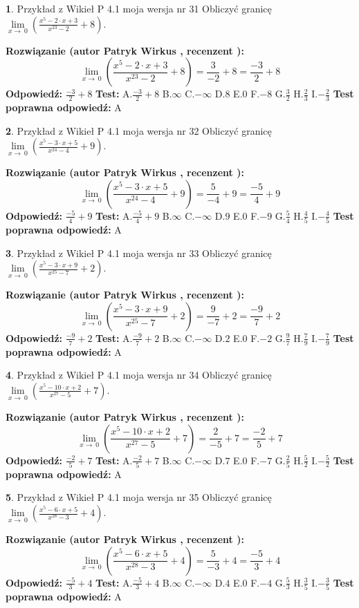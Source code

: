 \documentclass[12pt, a4paper]{article}
\theoremstyle{definition} %
\newtheorem{zad}{}
\newcommand{\zadStart}[1]{\begin{zad}#1\newline}
\newcommand{\zadStop}{\end{zad}}
\newcommand{\rozwStart}[2]{\noindent \textbf{Rozwiązanie (autor #1 , recenzent #2): }\newline}
\newcommand{\rozwStop}{\newline}
\newcommand{\odpStart}{\noindent \textbf{Odpowiedź:}\newline}
\newcommand{\odpStop}{\newline}
\newcommand{\testStart}{\noindent \textbf{Test:}\newline}
\newcommand{\testStop}{\newline}
\newcommand{\kluczStart}{\noindent \textbf{Test poprawna odpowiedź:}\newline}
\newcommand{\kluczStop}{\newline}
\begin{document}
\zadStart{Przykład z Wikieł P 4.1 moja wersja nr 31}
Obliczyć granicę $\lim\limits_{x\to\ 0}(\frac{x^{5}-2 \cdot x +3}{x^{23}-2}+8)$.
\zadStop
\rozwStart{Patryk Wirkus}{}
$$\lim\limits_{x\to\ 0}(\frac{x^{5}-2 \cdot x +3}{x^{23}-2}+8)=\frac{3}{-2}+8=\frac{-3}{2}+8$$
\rozwStop
\odpStart
$\frac{-3}{2}+8$
\odpStop
\testStart
A.$\frac{-3}{2}+8$
B.$\infty$
C.$-\infty$
D.$8$
E.$0$
F.$-8$
G.$\frac{3}{2}$
H.$\frac{2}{3}$
I.$-\frac{2}{3}$
\testStop
\kluczStart
A
\kluczStop



\zadStart{Przykład z Wikieł P 4.1 moja wersja nr 32}
Obliczyć granicę $\lim\limits_{x\to\ 0}(\frac{x^{5}-3 \cdot x +5}{x^{24}-4}+9)$.
\zadStop
\rozwStart{Patryk Wirkus}{}
$$\lim\limits_{x\to\ 0}(\frac{x^{5}-3 \cdot x +5}{x^{24}-4}+9)=\frac{5}{-4}+9=\frac{-5}{4}+9$$
\rozwStop
\odpStart
$\frac{-5}{4}+9$
\odpStop
\testStart
A.$\frac{-5}{4}+9$
B.$\infty$
C.$-\infty$
D.$9$
E.$0$
F.$-9$
G.$\frac{5}{4}$
H.$\frac{4}{5}$
I.$-\frac{4}{5}$
\testStop
\kluczStart
A
\kluczStop



\zadStart{Przykład z Wikieł P 4.1 moja wersja nr 33}
Obliczyć granicę $\lim\limits_{x\to\ 0}(\frac{x^{5}-3 \cdot x +9}{x^{25}-7}+2)$.
\zadStop
\rozwStart{Patryk Wirkus}{}
$$\lim\limits_{x\to\ 0}(\frac{x^{5}-3 \cdot x +9}{x^{25}-7}+2)=\frac{9}{-7}+2=\frac{-9}{7}+2$$
\rozwStop
\odpStart
$\frac{-9}{7}+2$
\odpStop
\testStart
A.$\frac{-9}{7}+2$
B.$\infty$
C.$-\infty$
D.$2$
E.$0$
F.$-2$
G.$\frac{9}{7}$
H.$\frac{7}{9}$
I.$-\frac{7}{9}$
\testStop
\kluczStart
A
\kluczStop



\zadStart{Przykład z Wikieł P 4.1 moja wersja nr 34}
Obliczyć granicę $\lim\limits_{x\to\ 0}(\frac{x^{5}-10 \cdot x +2}{x^{27}-5}+7)$.
\zadStop
\rozwStart{Patryk Wirkus}{}
$$\lim\limits_{x\to\ 0}(\frac{x^{5}-10 \cdot x +2}{x^{27}-5}+7)=\frac{2}{-5}+7=\frac{-2}{5}+7$$
\rozwStop
\odpStart
$\frac{-2}{5}+7$
\odpStop
\testStart
A.$\frac{-2}{5}+7$
B.$\infty$
C.$-\infty$
D.$7$
E.$0$
F.$-7$
G.$\frac{2}{5}$
H.$\frac{5}{2}$
I.$-\frac{5}{2}$
\testStop
\kluczStart
A
\kluczStop



\zadStart{Przykład z Wikieł P 4.1 moja wersja nr 35}
Obliczyć granicę $\lim\limits_{x\to\ 0}(\frac{x^{5}-6 \cdot x +5}{x^{28}-3}+4)$.
\zadStop
\rozwStart{Patryk Wirkus}{}
$$\lim\limits_{x\to\ 0}(\frac{x^{5}-6 \cdot x +5}{x^{28}-3}+4)=\frac{5}{-3}+4=\frac{-5}{3}+4$$
\rozwStop
\odpStart
$\frac{-5}{3}+4$
\odpStop
\testStart
A.$\frac{-5}{3}+4$
B.$\infty$
C.$-\infty$
D.$4$
E.$0$
F.$-4$
G.$\frac{5}{3}$
H.$\frac{3}{5}$
I.$-\frac{3}{5}$
\testStop
\kluczStart
A
\kluczStop
\end{document}
